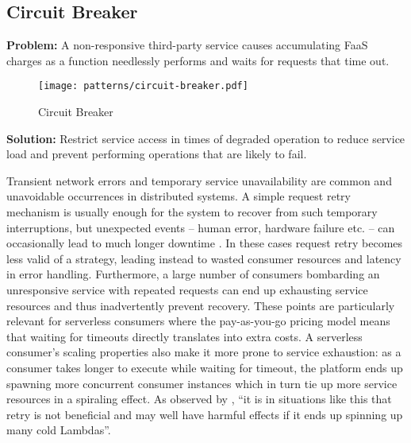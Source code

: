 \subsection{Circuit Breaker} \label{subsec:circuitBreaker}

\textbf{Problem:} A non-responsive third-party service causes accumulating FaaS charges as a function needlessly performs and waits for requests that time out.

\begin{figure}[h]
  \centering
  \texttt{[image: patterns/circuit-breaker.pdf]}
  \caption{Circuit Breaker}
  \label{fig:circuitBreaker}
\end{figure}

\textbf{Solution:} Restrict service access in times of degraded operation to reduce service load and prevent performing operations that are likely to fail.

Transient network errors and temporary service unavailability are common and unavoidable occurrences in distributed systems. A simple request retry mechanism is usually enough for the system to recover from such temporary interruptions, but unexpected events -- human error, hardware failure etc. -- can occasionally lead to much longer downtime \parencite{microsoft18cloudPatterns}. In these cases request retry becomes less valid of a strategy, leading instead to wasted consumer resources and latency in error handling. Furthermore, a large number of consumers bombarding an unresponsive service with repeated requests can end up exhausting service resources and thus inadvertently prevent recovery. These points are particularly relevant for serverless consumers where the pay-as-you-go pricing model means that waiting for timeouts directly translates into extra costs. A serverless consumer's scaling properties also make it more prone to service exhaustion: as a consumer takes longer to execute while waiting for timeout, the platform ends up spawning more concurrent consumer instances which in turn tie up more service resources in a spiraling effect. As observed by \textcite{bardsley18optimizationStrategies}, ``it is in situations like this that retry is not beneficial and may well have harmful effects if it ends up spinning up many cold Lambdas''.

